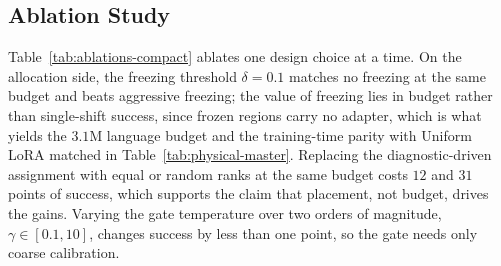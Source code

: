 





% 


\subsection{Ablation Study}
\label{sec:exp-ablations}

Table~\ref{tab:ablations-compact} ablates one design choice at a time.
On the allocation side, the freezing threshold $\delta = 0.1$ matches no freezing at the same budget and beats aggressive freezing; the value of freezing lies in budget rather than single-shift success, since frozen regions carry no adapter, which is what yields the $3.1$M language budget and the training-time parity with Uniform LoRA matched in Table~\ref{tab:physical-master}.
Replacing the diagnostic-driven assignment with equal or random ranks at the same budget costs $12$ and $31$ points of success, which supports the claim that placement, not budget, drives the gains.
Varying the gate temperature over two orders of magnitude, $\gamma \in [0.1, 10]$, changes success by less than one point, so the gate needs only coarse calibration.

